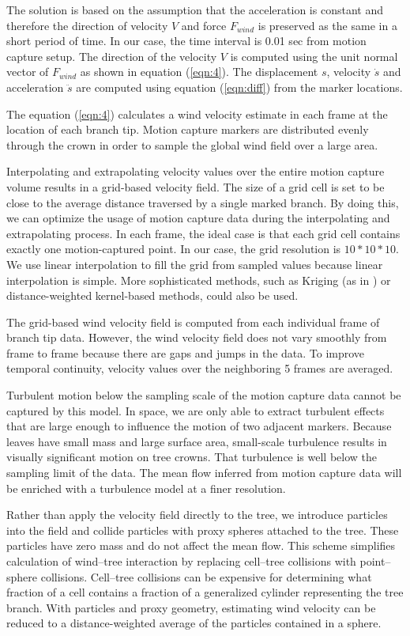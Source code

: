 The solution is based on the assumption that the acceleration is constant and therefore the direction of velocity $V$ and force $F_{wind}$ is preserved as the same in a short period of time. In our case, the time interval is 0.01 sec from motion capture setup. The direction of the velocity $V$ is computed using the unit normal vector of $F_{wind}$ as shown in equation (\ref{eqn:4}). The displacement $s$, velocity $\dot{s}$ and acceleration $\ddot{s}$ are computed using equation (\ref{eqn:diff}) from the marker locations.

The equation (\ref{eqn:4}) calculates a wind velocity estimate in each frame at the location of each branch tip.  Motion capture markers are distributed evenly through the crown in order to sample the global wind field over a large area. 

Interpolating and extrapolating velocity values over the entire motion capture volume results in a grid-based velocity field. The size of a grid cell is set to be close to the average distance traversed by a single marked branch. By doing this, we can optimize the usage of motion capture data during the interpolating and extrapolating process. In each frame, the ideal case is that each grid cell contains exactly one motion-captured point. In our case, the grid resolution is $10*10*10$. We use linear interpolation to fill the grid from sampled values because linear interpolation is simple.  More sophisticated methods, such as Kriging (as in \cite{ganz:cvpr09}) or distance-weighted kernel-based methods, could also be used.

The grid-based wind velocity field is computed from each individual frame of branch tip data. However, the wind velocity field does not vary smoothly from frame to frame because there are gaps and jumps in the data. To improve temporal continuity, velocity values over the neighboring 5 frames are averaged. 

Turbulent motion below the sampling scale of the motion capture data cannot be captured by this model. In space, we are only able to extract turbulent effects that are large enough to influence the motion of two adjacent markers. Because leaves have small mass and large surface area, small-scale turbulence results in visually significant motion on tree crowns. That turbulence is well below the sampling limit of the data. The mean flow inferred from motion capture data will be enriched with a turbulence model at a finer resolution. 

Rather than apply the velocity field directly to the tree, we introduce particles into the field and collide particles with proxy spheres attached to the tree. These particles have zero mass and do not affect the mean flow. This scheme simplifies calculation of wind--tree interaction by replacing cell--tree collisions with point--sphere collisions. Cell--tree collisions can be expensive for determining what fraction of a cell contains a fraction of a generalized cylinder representing the tree branch. With particles and proxy geometry, estimating wind velocity can be reduced to a distance-weighted average of the particles contained in a sphere. 

